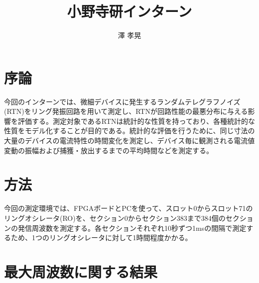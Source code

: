 \documentclass{jsarticle}
\begin{document}
\title{小野寺研インターン}
\author{澤 孝晃}
\maketitle

\section{序論}

今回のインターンでは、微細デバイスに発生するランダムテレグラフノイズ(RTN)をリング発振回路を用いて測定し、RTNが回路性能の最悪分布に与える影響を評価する。測定対象であるRTNは統計的な性質を持っており、各種統計的な性質をモデル化することが目的である。統計的な評価を行うために、同じ寸法の大量のデバイスの電流特性の時間変化を測定し、デバイス毎に観測される電流値変動の振幅および捕獲・放出するまでの平均時間などを測定する。

\section{方法}

今回の測定環境では、FPGAボードとPCを使って、スロット0からスロット71のリングオシレータ(RO)を、セクション0からセクション383まで384個のセクションの発信周波数を測定する。各セクションそれぞれ10秒ずつ1msの間隔で測定するため、1つのリングオシレータに対して1時間程度かかる。

\section{最大周波数に関する結果}
\end{document}
